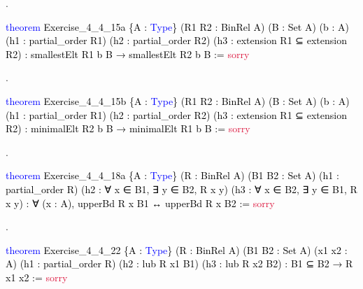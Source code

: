 \documentclass[
  letterpaper,
  DIV=11,
  numbers=noendperiod]{scrreprt}
\newenvironment{Shaded}{\begin{snugshade}}{\end{snugshade}}
\newcommand{\ConstantTok}[1]{\textcolor[rgb]{0.56,0.35,0.01}{#1}}
\newcommand{\KeywordTok}[1]{\textcolor[rgb]{0.00,0.23,0.31}{#1}}
\newcommand{\NormalTok}[1]{\textcolor[rgb]{0.00,0.23,0.31}{#1}}
\renewcommand{\NormalTok}[1]{\textcolor[HTML]{000000}{#1}}
\renewcommand{\KeywordTok}[1]{\textcolor[HTML]{0000FF}{#1}}
\renewcommand{\ConstantTok}[1]{\textcolor[HTML]{DC143C}{#1}}
\newcommand{\nobreakShaded}{\renewenvironment{Shaded}
	{\begin{tcolorbox}[frame hidden, enhanced, interior hidden, boxrule=0pt,
		borderline west={3pt}{0pt}{shadecolor}, sharp corners]}
	{\end{tcolorbox}}}
\newenvironment{numex}[1]
	{\begin{minipage}[t]{0.04\textwidth}\vspace{8pt}{#1}.
		\end{minipage}\nobreakShaded\begin{minipage}[t]{0.96\textwidth}\vspace{0pt}}
	{\end{minipage}}
\theoremstyle{remark}
\begin{document}
\begin{numex}{6}

\begin{Shaded}
\begin{Highlighting}[]
\KeywordTok{theorem}\NormalTok{ Exercise\_4\_4\_15a \{A : }\KeywordTok{Type}\NormalTok{\}}
\NormalTok{    (R1 R2 : BinRel A) (B : Set A) (b : A)}
\NormalTok{    (h1 : partial\_order R1) (h2 : partial\_order R2)}
\NormalTok{    (h3 : extension R1 ⊆ extension R2) :}
\NormalTok{    smallestElt R1 b B → smallestElt R2 b B := }\ConstantTok{sorry}
\end{Highlighting}
\end{Shaded}

\end{numex}

\begin{numex}{7}

\begin{Shaded}
\begin{Highlighting}[]
\KeywordTok{theorem}\NormalTok{ Exercise\_4\_4\_15b \{A : }\KeywordTok{Type}\NormalTok{\}}
\NormalTok{    (R1 R2 : BinRel A) (B : Set A) (b : A)}
\NormalTok{    (h1 : partial\_order R1) (h2 : partial\_order R2)}
\NormalTok{    (h3 : extension R1 ⊆ extension R2) :}
\NormalTok{    minimalElt R2 b B → minimalElt R1 b B := }\ConstantTok{sorry}
\end{Highlighting}
\end{Shaded}

\end{numex}

\begin{numex}{8}

\begin{Shaded}
\begin{Highlighting}[]
\KeywordTok{theorem}\NormalTok{ Exercise\_4\_4\_18a \{A : }\KeywordTok{Type}\NormalTok{\}}
\NormalTok{    (R : BinRel A) (B1 B2 : Set A) (h1 : partial\_order R)}
\NormalTok{    (h2 : ∀ x ∈ B1, ∃ y ∈ B2, R x y) (h3 : ∀ x ∈ B2, ∃ y ∈ B1, R x y) :}
\NormalTok{    ∀ (x : A), upperBd R x B1 ↔ upperBd R x B2 := }\ConstantTok{sorry}
\end{Highlighting}
\end{Shaded}

\end{numex}

\begin{numex}{9}

\begin{Shaded}
\begin{Highlighting}[]
\KeywordTok{theorem}\NormalTok{ Exercise\_4\_4\_22 \{A : }\KeywordTok{Type}\NormalTok{\}}
\NormalTok{    (R : BinRel A) (B1 B2 : Set A) (x1 x2 : A)}
\NormalTok{    (h1 : partial\_order R) (h2 : lub R x1 B1) (h3 : lub R x2 B2) :}
\NormalTok{    B1 ⊆ B2 → R x1 x2 := }\ConstantTok{sorry}
\end{Highlighting}
\end{Shaded}

\end{numex}
\end{document}
